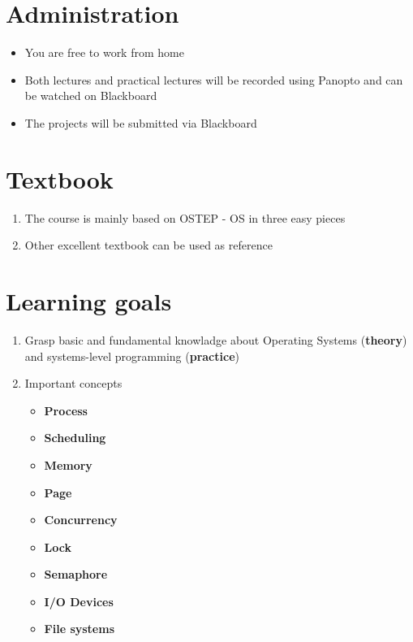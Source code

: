 \documentclass{article}
\begin{document}
\section{Administration}
\begin{itemize}
    \item You are free to work from home
    \item Both lectures and practical lectures will be recorded using Panopto and can be watched on Blackboard
    \item The projects will be submitted via Blackboard
\end{itemize}

\section{Textbook}
\begin{enumerate}
    \item The course is mainly based on OSTEP - OS in three easy pieces
    \item Other excellent textbook can be used as reference
\end{enumerate}

\section{Learning goals}
\begin{enumerate}
\item Grasp basic and fundamental knowladge about Operating Systems (\textbf{theory}) and systems-level programming (\textbf{practice})
    \item Important concepts
        \begin{itemize}[-]
            \color{blue!45!white}
            \item \textbf{Process}
            \item \textbf{Scheduling}
            \item \textbf{Memory}
            \item \textbf{Page}
            \item \textbf{Concurrency}
            \item \textbf{Lock}
            \item \textbf{Semaphore}
            \item \textbf{I/O Devices}
            \item \textbf{File systems}
        \end{itemize}
\end{enumerate}
\end{document}
